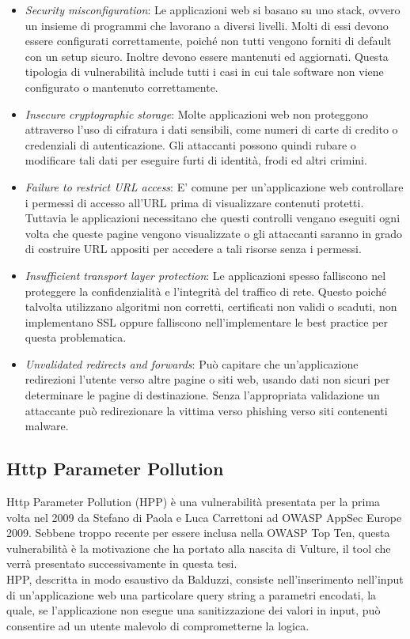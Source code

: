 \begin{itemize}
\item \emph{Security misconfiguration}: Le applicazioni web si basano su uno stack, ovvero un insieme di programmi che lavorano a diversi livelli. Molti di essi devono essere configurati correttamente, poiché non tutti vengono forniti di default con un setup sicuro. Inoltre devono essere mantenuti ed aggiornati. Questa tipologia di vulnerabilità include tutti i casi in cui tale software non viene configurato o mantenuto correttamente.
\item \emph{Insecure cryptographic storage}: Molte applicazioni web non proteggono attraverso l'uso di cifratura i dati sensibili, come numeri di carte di credito o credenziali di autenticazione. Gli attaccanti possono quindi rubare o modificare tali dati per eseguire furti di identità, frodi ed altri crimini.
\item \emph{Failure to restrict URL access}: E' comune per un'applicazione web controllare i permessi di accesso all'URL prima di visualizzare contenuti protetti. Tuttavia le applicazioni necessitano che questi controlli vengano eseguiti ogni volta che queste pagine vengono visualizzate o gli attaccanti saranno in grado di costruire URL appositi per accedere a tali risorse senza i permessi.
\item \emph{Insufficient transport layer protection}: Le applicazioni spesso falliscono nel proteggere la confidenzialità e l'integrità del traffico di rete. Questo poiché talvolta utilizzano algoritmi non corretti, certificati non validi o scaduti, non implementano SSL oppure falliscono nell'implementare le best practice per questa problematica.
\item \emph{Unvalidated redirects and forwards}: Può capitare che un'applicazione redirezioni l'utente verso altre pagine o siti web, usando dati non sicuri per determinare le pagine di destinazione. Senza l'appropriata validazione un attaccante può redirezionare la vittima verso phishing verso siti contenenti malware.
\end{itemize}

\subsection{Http Parameter Pollution}
Http Parameter Pollution (HPP) è una vulnerabilità presentata per la prima volta nel 2009 da Stefano di Paola e Luca Carrettoni\cite{dipaola} ad OWASP AppSec Europe 2009. Sebbene troppo recente per essere inclusa nella OWASP Top Ten, questa vulnerabilità è la motivazione che ha portato alla nascita di Vulture, il tool che verrà presentato successivamente in questa tesi.\\
HPP, descritta in modo esaustivo da Balduzzi\cite{hppbalduzzi}, consiste nell'inserimento nell'input di un'applicazione web una particolare query string a parametri encodati, la quale, se l'applicazione non esegue una sanitizzazione dei valori in input, può consentire ad un utente malevolo di comprometterne la logica.

